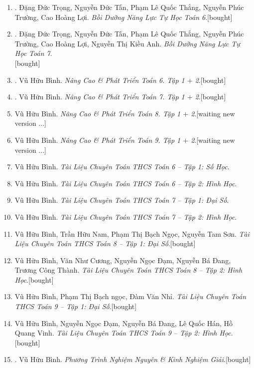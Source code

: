 \documentclass{article}
\begin{document}
\begin{enumerate}
	\item \cite{Trong_Toan_6_2021}. Đặng Đức Trọng, Nguyễn Đức Tấn, Phạm Lê Quốc Thắng, Nguyễn Phúc Trường, Cao Hoàng Lợi. \textit{Bồi Dưỡng Năng Lực Tự Học Toán 6}.\hfill\textsf{[bought]}
	\item \cite{Trong_Toan_7_2022}. Đặng Đức Trọng, Nguyễn Đức Tấn, Phạm Lê Quốc Thắng, Nguyễn Phúc Trường, Cao Hoàng Lợi, Nguyễn Thị Kiều Anh. \textit{Bồi Dưỡng Năng Lực Tự Học Toán 7}.\\\mbox{}\hfill\textsf{[bought]}
	\item \cite{Binh_Toan_6_tap_1, Binh_Toan_6_tap_2}. Vũ Hữu Bình. \textit{Nâng Cao \& Phát Triển Toán 6. Tập 1 $+$ 2}.\hfill\textsf{[bought]}
	\item \cite{Binh_Toan_7_tap_1, Binh_Toan_7_tap_2}. Vũ Hữu Bình. \textit{Nâng Cao \& Phát Triển Toán 7. Tập 1 $+$ 2}.\hfill\textsf{[bought]}
	\item Vũ Hữu Bình. \textit{Nâng Cao \& Phát Triển Toán 8. Tập 1 $+$ 2}.\hfill\textsf{[waiting new version ...]}
	\item Vũ Hữu Bình. \textit{Nâng Cao \& Phát Triển Toán 9. Tập 1 $+$ 2}.\hfill\textsf{[waiting new version ...]}
	\item Vũ Hữu Bình. \textit{Tài Liệu Chuyên Toán THCS Toán 6 -- Tập 1: Số Học}.
	\item Vũ Hữu Bình. \textit{Tài Liệu Chuyên Toán THCS Toán 6 -- Tập 2: Hình Học}.	
	\item Vũ Hữu Bình. \textit{Tài Liệu Chuyên Toán THCS Toán 7 -- Tập 1: Đại Số}.
	\item Vũ Hữu Bình. \textit{Tài Liệu Chuyên Toán THCS Toán 7 -- Tập 2: Hình Học}.
	\item Vũ Hữu Bình, Trần Hữu Nam, Phạm Thị Bạch Ngọc, Nguyễn Tam Sơn. \textit{Tài Liệu Chuyên Toán THCS Toán 8 -- Tập 1: Đại Số}.\hfill\textsf{[bought]}
	\item Vũ Hữu Bình, Văn Như Cương, Nguyễn Ngọc Đạm, Nguyễn Bá Đang, Trương Công Thành. \textit{Tài Liệu Chuyên Toán THCS Toán 8 -- Tập 2: Hình Học}.\hfill\textsf{[bought]}
	\item Vũ Hữu Bình, Phạm Thị Bạch ngọc, Đàm Văn Nhỉ. \textit{Tài Liệu Chuyên Toán THCS Toán 9 -- Tập 1: Đại Số}.\hfill\textsf{[bought]}
	\item Vũ Hữu Bình, Nguyễn Ngọc Đạm, Nguyễn Bá Đang, Lê Quốc Hán, Hồ Quang Vinh. \textit{Tài Liệu Chuyên Toán THCS Toán 9 -- Tập 2: Hình Học}.\hfill\textsf{[bought]}
	\item \cite{Binh_PTNN}. Vũ Hữu Bình. \textit{Phương Trình Nghiệm Nguyên \& Kinh Nghiệm Giải}.\hfill\textsf{[bought]}

\end{enumerate}
\end{document}
